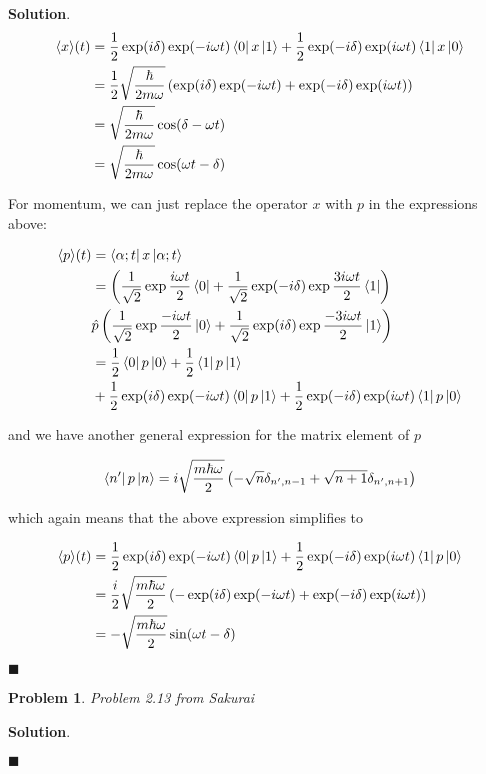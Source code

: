 \documentclass[12pt]{article}
\newtheorem{p}{Problem}
\theoremstyle{definition}
\newenvironment{s}{%
        \begin{trivlist} \item \textbf{Solution}. }{%
            \hspace*{\fill} $\blacksquare$\end{trivlist}}%
\begin{document}
{\begin{s}
\begin{align*}
\langle x\rangle(t) &= \frac{1}{2}\exp(i\delta)\exp(-i\omega t)\bra{0}x\ket{1} + \frac{1}{2}\exp(-i\delta)\exp(i\omega t)\bra{1}x\ket{0}\\
&= \frac{1}{2}\sqrt{\frac{\hbar}{2m\omega}}\left(\exp(i\delta)\exp(-i\omega t)+\exp(-i\delta)\exp(i\omega t)\right)\\
&= \sqrt{\frac{\hbar}{2m\omega}}\cos(\delta-\omega t)\\
&= \sqrt{\frac{\hbar}{2m\omega}}\cos(\omega t-\delta)
\end{align*}

For momentum, we can just replace the operator $x$ with $p$ in the expressions above:

\begin{align*}
\langle p\rangle(t) &= \bra{\alpha;t}x\ket{\alpha;t}\\
&= \left(\frac{1}{\sqrt{2}}\exp\frac{i\omega t}{2}\bra{0} + \frac{1}{\sqrt{2}}\exp(-i\delta)\exp\frac{3i\omega t}{2}\bra{1}\right) \\
&\hat{p} \left(\frac{1}{\sqrt{2}}\exp\frac{-i\omega t}{2}\ket{0} + \frac{1}{\sqrt{2}}\exp(i\delta)\exp\frac{-3i\omega t}{2}\ket{1}\right)\\
&= \frac{1}{2}\bra{0}p\ket{0} + \frac{1}{2}\bra{1}p\ket{1} \\
&+ \frac{1}{2}\exp(i\delta)\exp(-i\omega t)\bra{0}p\ket{1} + \frac{1}{2}\exp(-i\delta)\exp(i\omega t)\bra{1}p\ket{0}
\end{align*}

and we have another general expression for the matrix element of $p$

\begin{align*}
\bra{n'}p\ket{n} = i\sqrt{\frac{m\hbar\omega}{2}}\left(-\sqrt{n}\delta_{n',n-1} +\sqrt{n+1}\delta_{n',n+1}\right)
\end{align*}

which again means that the above expression simplifies to 

\begin{align*}
\langle p\rangle(t) &= \frac{1}{2}\exp(i\delta)\exp(-i\omega t)\bra{0}p\ket{1} + \frac{1}{2}\exp(-i\delta)\exp(i\omega t)\bra{1}p\ket{0}\\
&= \frac{i}{2}\sqrt{\frac{m\hbar\omega}{2}}\left(-\exp(i\delta)\exp(-i\omega t)+\exp(-i\delta)\exp(i\omega t)\right)\\
&= -\sqrt{\frac{m\hbar\omega}{2}}\sin(\omega t - \delta)
\end{align*}

\end{s}

\begin{p}
Problem 2.13 from Sakurai
\end{p}

\begin{s}

\end{s}
\end{document}
